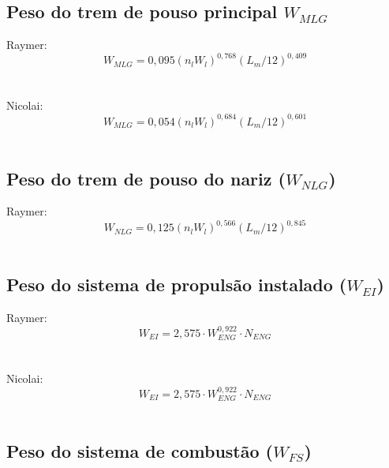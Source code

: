   \subsection{Peso do trem de pouso principal {$W_{MLG}$}}

    Raymer:
    \begin{equation*}
      W_{MLG} = 0,095 \left(
        n_l W_l
      \right) ^{0,768}
      \left(
        L_m / 12
      \right) ^{0,409}
    \end{equation*}
		\\~\\
    Nicolai:
    \begin{equation*}
      W_{MLG} = 0,054 \left(
        n_l W_l
      \right) ^{0,684}
      \left(
        L_m / 12
      \right) ^{0,601}
    \end{equation*}
		\\

  \subsection{Peso do trem de pouso do nariz ($W_{NLG}$)}

    Raymer:
    \begin{equation*}
      W_{NLG} = 0,125 \left(
        n_l W_l
      \right) ^{0,566}
      \left(
        L_m / 12
      \right) ^{0,845}
    \end{equation*}
		\\

  \subsection{Peso do sistema de propulsão instalado ($W_{EI}$)}

    Raymer:
    \begin{equation*}
      W_{EI} = 2,575 \cdot
        W_{ENG}^{0,922} \cdot
        N_{ENG}
    \end{equation*}
		\\~\\
    Nicolai:
    \begin{equation*}
      W_{EI} = 2,575 \cdot
        W_{ENG}^{0,922} \cdot
        N_{ENG}
    \end{equation*}
		\\

  \subsection{Peso do sistema de combustão ($W_{FS}$)}

